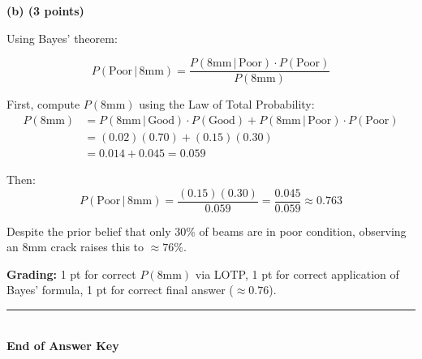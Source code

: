 \documentclass[11pt,a4paper]{article}
\begin{document}
\vspace{0.3cm}

\noindent\textbf{(b) (3 points)}

\begin{answerbox}
Using Bayes' theorem:

$$P(\text{Poor} \,|\, \text{8mm}) = \frac{P(\text{8mm} \,|\, \text{Poor}) \cdot P(\text{Poor})}{P(\text{8mm})}$$

First, compute $P(\text{8mm})$ using the Law of Total Probability:
\begin{align*}
P(\text{8mm}) &= P(\text{8mm} \,|\, \text{Good}) \cdot P(\text{Good}) + P(\text{8mm} \,|\, \text{Poor}) \cdot P(\text{Poor}) \\
&= (0.02)(0.70) + (0.15)(0.30) \\
&= 0.014 + 0.045 = 0.059
\end{align*}

Then:
$$P(\text{Poor} \,|\, \text{8mm}) = \frac{(0.15)(0.30)}{0.059} = \frac{0.045}{0.059} \approx \boxed{0.763}$$

Despite the prior belief that only 30\% of beams are in poor condition, observing an 8mm crack raises this to $\approx 76\%$.

\textbf{Grading:} 1 pt for correct $P(\text{8mm})$ via LOTP, 1 pt for correct application of Bayes' formula, 1 pt for correct final answer ($\approx 0.76$).
\end{answerbox}

\vspace{0.5cm}
\begin{center}
\noindent\rule{0.5\linewidth}{0.4pt}\\[0.3cm]
\textbf{End of Answer Key}
\end{center}
\end{document}

